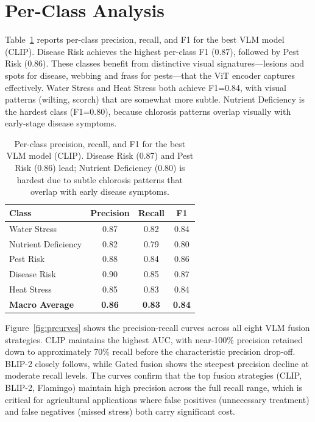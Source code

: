 \documentclass[12pt, a4paper, oneside]{Thesis}
\begin{document}
\clearpage
\section{Per-Class Analysis}

Table~\ref{tab:perclass} reports per-class precision, recall, and F1 for the best VLM model (CLIP). Disease Risk achieves the highest per-class F1 (0.87), followed by Pest Risk (0.86). These classes benefit from distinctive visual signatures---lesions and spots for disease, webbing and frass for pests---that the ViT encoder captures effectively. Water Stress and Heat Stress both achieve F1=0.84, with visual patterns (wilting, scorch) that are somewhat more subtle. Nutrient Deficiency is the hardest class (F1=0.80), because chlorosis patterns overlap visually with early-stage disease symptoms.

\begin{table}[htbp]\centering
\small
\begin{tabular}{lccc}
\toprule
\textbf{Class} & \textbf{Precision} & \textbf{Recall} & \textbf{F1}\\
\midrule
Water Stress        & 0.87 & 0.82 & 0.84 \\
Nutrient Deficiency & 0.82 & 0.79 & 0.80 \\
Pest Risk           & 0.88 & 0.84 & 0.86 \\
Disease Risk        & 0.90 & 0.85 & 0.87 \\
Heat Stress         & 0.85 & 0.83 & 0.84 \\
\midrule
\textbf{Macro Average} & \textbf{0.86} & \textbf{0.83} & \textbf{0.84}\\
\bottomrule
\end{tabular}
\caption{Per-class precision, recall, and F1 for the best VLM model (CLIP). Disease Risk (0.87) and Pest Risk (0.86) lead; Nutrient Deficiency (0.80) is hardest due to subtle chlorosis patterns that overlap with early disease symptoms.}
\label{tab:perclass}
\end{table}

Figure~\ref{fig:prcurves} shows the precision-recall curves across all eight VLM fusion strategies. CLIP maintains the highest AUC, with near-100\% precision retained down to approximately 70\% recall before the characteristic precision drop-off. BLIP-2 closely follows, while Gated fusion shows the steepest precision decline at moderate recall levels. The curves confirm that the top fusion strategies (CLIP, BLIP-2, Flamingo) maintain high precision across the full recall range, which is critical for agricultural applications where false positives (unnecessary treatment) and false negatives (missed stress) both carry significant cost.
\end{document}

